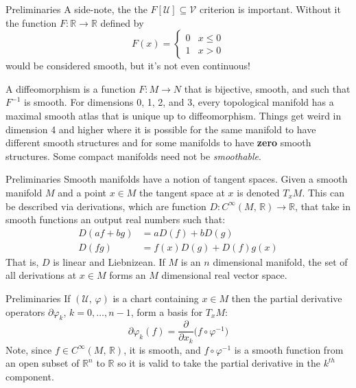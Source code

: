 \documentclass{beamer}
\begin{document}
    \begin{frame}{Preliminaries}
        A side-note, the
        the $F[\mathcal{U}]\subseteq\mathcal{V}$ criterion is important.
        Without it the function $F:\mathbb{R}\rightarrow\mathbb{R}$
        defined by
        \begin{equation}
            F(x)=
            \begin{cases}
                0&x\leq{0}\\
                1&x>0
            \end{cases}
        \end{equation}
        would be considered smooth, but it's not even continuous!
        \par\hfill\par
        A diffeomorphism is a function $F:M\rightarrow{N}$ that is bijective,
        smooth, and such that $F^{-1}$ is smooth.
        For dimensions 0, 1, 2, and 3, every topological manifold has a
        maximal smooth atlas that is unique up to diffeomorphism. Things get
        weird in dimension 4 and higher where it is possible for the same
        manifold to have different smooth structures and for some manifolds to
        have \textbf{zero} smooth structures. Some compact manifolds need not
        be \textit{smoothable}.
    \end{frame}
    \begin{frame}{Preliminaries}
        Smooth manifolds have a notion of tangent spaces. Given a smooth
        manifold $M$ and a point $x\in{M}$ the tangent space at $x$ is
        denoted $T_{x}M$. This can be described via derivations, which are
        function $D:C^{\infty}(M,\,\mathbb{R})\rightarrow\mathbb{R}$, that take
        in smooth functions an output real numbers such that:
        \begin{align}
            D(af+bg)&=aD(f)+bD(g)\\
            D(fg)&=f(x)D(g)+D(f)g(x)
        \end{align}
        That is, $D$ is linear and Liebnizean. If $M$ is an $n$ dimensional
        manifold, the set of all derivations at $x\in{M}$ forms an $M$
        dimensional real vector space.
    \end{frame}
    \begin{frame}{Preliminaries}
        If $(\mathcal{U},\,\varphi)$ is a chart containing $x\in{M}$ then the
        partial derivative operators $\partial\varphi_{k}$, $k=0,\dots,n-1$,
        form a basis for $T_{x}M$:
        \begin{equation}
            \partial\varphi_{k}(f)
            =\frac{\partial}{\partial{x}_{k}}\Big(f\circ\varphi^{-1}\Big)
        \end{equation}
        Note, since $f\in{C}^{\infty}(M,\,\mathbb{R})$, it is smooth, and
        $f\circ\varphi^{-1}$ is a smooth function from an open subset of
        $\mathbb{R}^{n}$ to $\mathbb{R}$ so it is valid to take the partial
        derivative in the $k^{th}$ component.
    \end{frame}
\end{document}
